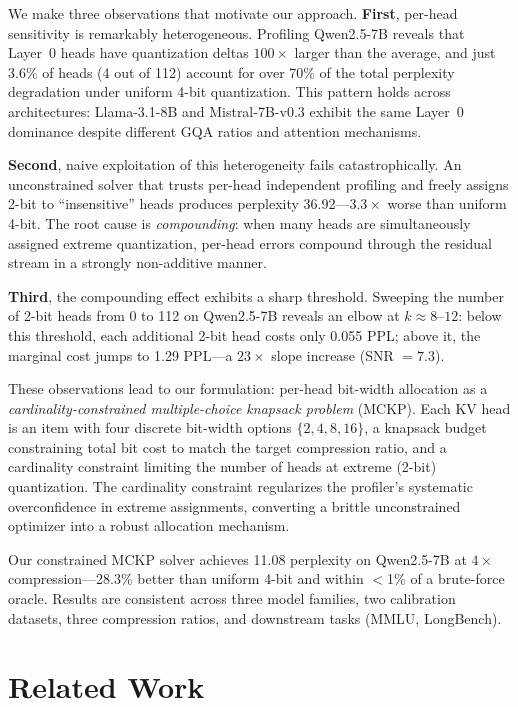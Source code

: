 \documentclass[11pt,a4paper]{article}
\begin{document}
We make three observations that motivate our approach.
\textbf{First}, per-head sensitivity is remarkably heterogeneous.
Profiling Qwen2.5-7B reveals that Layer~0 heads have quantization deltas $100\times$ larger than the average, and just 3.6\% of heads (4 out of 112) account for over 70\% of the total perplexity degradation under uniform 4-bit quantization.
This pattern holds across architectures: Llama-3.1-8B and Mistral-7B-v0.3 exhibit the same Layer~0 dominance despite different GQA ratios and attention mechanisms.

\textbf{Second}, naive exploitation of this heterogeneity fails catastrophically.
An unconstrained solver that trusts per-head independent profiling and freely assigns 2-bit to ``insensitive'' heads produces perplexity 36.92---$3.3\times$ worse than uniform 4-bit.
The root cause is \emph{compounding}: when many heads are simultaneously assigned extreme quantization, per-head errors compound through the residual stream in a strongly non-additive manner.

\textbf{Third}, the compounding effect exhibits a sharp threshold.
Sweeping the number of 2-bit heads from 0 to 112 on Qwen2.5-7B reveals an elbow at $k \approx 8$--$12$: below this threshold, each additional 2-bit head costs only 0.055 PPL; above it, the marginal cost jumps to 1.29 PPL---a $23\times$ slope increase (SNR $= 7.3$).

These observations lead to our formulation: per-head bit-width allocation as a \emph{cardinality-constrained multiple-choice knapsack problem} (MCKP).
Each KV head is an item with four discrete bit-width options $\{2, 4, 8, 16\}$, a knapsack budget constraining total bit cost to match the target compression ratio, and a cardinality constraint limiting the number of heads at extreme (2-bit) quantization.
The cardinality constraint regularizes the profiler's systematic overconfidence in extreme assignments, converting a brittle unconstrained optimizer into a robust allocation mechanism.

Our constrained MCKP solver achieves 11.08 perplexity on Qwen2.5-7B at $4\times$ compression---28.3\% better than uniform 4-bit and within $<$1\% of a brute-force oracle.
Results are consistent across three model families, two calibration datasets, three compression ratios, and downstream tasks (MMLU, LongBench).

\section{Related Work}
\end{document}
